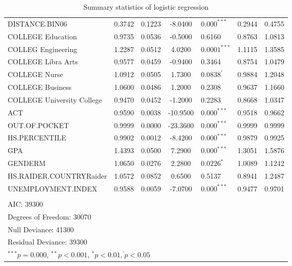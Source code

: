 \documentclass[12pt,english]{report}
\begin{document}
\begin{table}[]
\begin{adjustbox}{width=1.05\textwidth}
\begin{tabular}{lccclcc}
DISTANCE.BIN06 & 0.3742 & 0.1223 & -8.0400  & $0.000^{***}$ & 0.2944 & 0.4755\\
COLLEGE Education & 0.9735 & 0.0536 & -0.5000  & 0.6160 & 0.8763 & 1.0813\\
COLLEG Engineering & 1.2287 & 0.0512 & 4.0200   & $0.0001^{***}$
& 1.1115 & 1.3585\\
COLLEGE Libra Arts  & 0.9577 & 0.0459 & -0.9400  & 0.3464 & 0.8754
& 1.0479\\
COLLEGE Nurse  & 1.0912 & 0.0505 & 1.7300   & $0.0838^{'}$ &
0.9884 & 1.2048\\
COLLEGE Business & 1.0600 & 0.0486 & 1.2000   & 0.2308 & 0.9637 & 1.1660\\
COLLEGE University College & 0.9470 & 0.0452 & -1.2000  & 0.2283 & 0.8668 &
1.0347\\
ACT                     & 0.9590 & 0.0038 & -10.9500 & $0.000^{***}$ & 0.9518 &
0.9662\\
OUT.OF.POCKET           & 0.9999 & 0.0000 & -23.3600 & $0.000^{***}$ & 0.9999 &
0.9999\\
HS.PERCENTILE           & 0.9902 & 0.0012 & -8.4200  & $0.000^{***}$ & 0.9879 &
0.9925\\
GPA                     & 1.4393 & 0.0500 & 7.2900   & $0.000^{***}$ & 1.3051 &
1.5876\\
GENDERM                 & 1.0650 & 0.0276 & 2.2800   & $0.0226^{*}$ & 1.0089 &
1.1242\\
HS.RAIDER.COUNTRYRaider & 1.0572 & 0.0852 & 0.6500   & 0.5137 & 0.8941 & 1.2487\\
UNEMPLOYMENT.INDEX      & 0.9588 & 0.0059 & -7.0700  & $0.000^{***}$ & 0.9477 &
0.9701\\ 
\\
AIC: 39300\\
Degrees of Freedom: 30070 \\
Null Deviance:      41300 \\
Residual Deviance: 39300

\\
\hline
\multicolumn{7}{l}{\scriptsize{$^{***} p=0.000$, $^{**} p<0.001$, $^*
p<0.01$,$^{'}p<0.05$}}
\end{tabular}
\end{adjustbox}
\caption{Summary statistics of logistic regression}
\label{lr_summary}
\end{table}


        
\end{document}
